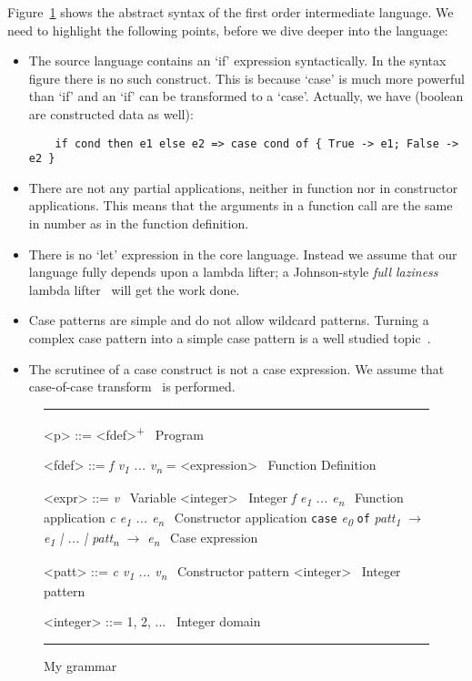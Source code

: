 \documentclass[diploma]{softlab-thesis}
\begin{document}
Figure~\ref{fig:grammar} shows the abstract syntax of 
the first order intermediate language.
We need to highlight the following points, before we dive deeper into the language:
\begin{itemize}
  \item The source language contains an `if' expression syntactically. In the syntax figure there is no such construct.
  This is because `case' is much more powerful than `if' and an `if' can be transformed to a `case'. 
  Actually, we have (boolean are constructed data as well):
  \begin{verbatim}
    if cond then e1 else e2 => case cond of { True -> e1; False -> e2 }
  \end{verbatim}
  \item There are not any partial applications, neither in function nor in constructor applications.
  This means that the arguments in a function call are the same in number as in the function definition.
  \item There is no `let' expression in the core language. Instead we assume that our language 
  fully depends upon a lambda lifter; a Johnson-style \textit{full laziness} lambda lifter~\cite{Johnsson:1985:LLT:5280.5292}
  will get the work done.
  \item Case patterns are simple and do not allow wildcard patterns. Turning a complex case pattern into
  a simple case pattern is a well studied topic~\cite{Au85,Wadler87}.
  \item The scrutinee of a case construct is not a case expression. We assume that case-of-case 
  transform~\cite{Jone98} is performed.
\end{itemize}

\begin{figure}[t]
\hrule
\begin{grammar}
    <p> ::= <fdef>\textsuperscript{+} \hfill\ Program

    <fdef> ::= \textit{f v\textsubscript{1} ... v\textsubscript{n}} = <expression> \hfill\ Function Definition

    <expr> ::= \textit{v} \hfill\ Variable
    \alt <integer> \hfill\ Integer
    \alt \textit{f e\textsubscript{1} ... e\textsubscript{n}} \hfill\ Function application
    \alt \textit{c e\textsubscript{1} ... e\textsubscript{n}} \hfill\ Constructor application
    \alt \texttt{case} \textit{e\textsubscript{0}} \texttt{of} \textit{patt\textsubscript{1} $\rightarrow$ e\textsubscript{1} | ... | patt\textsubscript{n} $\rightarrow$ e\textsubscript{n}} \hfill\ Case expression
     
    <patt> ::= \textit{c v\textsubscript{1} ... v\textsubscript{n}} \hfill\ Constructor pattern
    \alt <integer> \hfill\ Integer pattern

    <integer> ::= 1, 2, ... \hfill\ Integer domain

\end{grammar}
\hrule
\caption{My grammar\label{fig:grammar}}
\end{figure}
\end{document}
